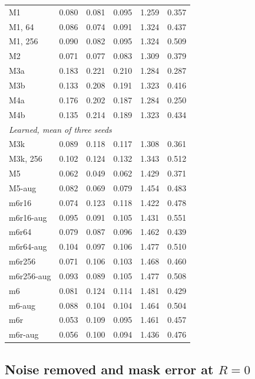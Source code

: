 \documentclass[preprint,12pt,authoryear]{elsarticle}
\begin{document}
\begin{table}[tbp]
\begin{tabular}{lccccc}
    M1 & 0.080 & 0.081 & 0.095 & 1.259 & 0.357 \\
    M1, 64 & 0.086 & 0.074 & 0.091 & 1.324 & 0.437 \\
    M1, 256 & 0.090 & 0.082 & 0.095 & 1.324 & 0.509 \\
    M2 & 0.071 & 0.077 & 0.083 & 1.309 & 0.379 \\
    M3a & 0.183 & 0.221 & 0.210 & 1.284 & 0.287 \\
    M3b & 0.133 & 0.208 & 0.191 & 1.323 & 0.416 \\
    M4a & 0.176 & 0.202 & 0.187 & 1.284 & 0.250 \\
    M4b & 0.135 & 0.214 & 0.189 & 1.323 & 0.434 \\
    \multicolumn{6}{l}{\textit{Learned, mean of three seeds}} \\
    M3k & 0.089 & 0.118 & 0.117 & 1.308 & 0.361 \\
    M3k, 256 & 0.102 & 0.124 & 0.132 & 1.343 & 0.512 \\
    M5 & 0.062 & 0.049 & 0.062 & 1.429 & 0.371 \\
    M5-aug & 0.082 & 0.069 & 0.079 & 1.454 & 0.483 \\
    m6r16 & 0.074 & 0.123 & 0.118 & 1.422 & 0.478 \\
    m6r16-aug & 0.095 & 0.091 & 0.105 & 1.431 & 0.551 \\
    m6r64 & 0.079 & 0.087 & 0.096 & 1.462 & 0.439 \\
    m6r64-aug & 0.104 & 0.097 & 0.106 & 1.477 & 0.510 \\
    m6r256 & 0.071 & 0.106 & 0.103 & 1.468 & 0.460 \\
    m6r256-aug & 0.093 & 0.089 & 0.105 & 1.477 & 0.508 \\
    m6 & 0.081 & 0.124 & 0.114 & 1.481 & 0.429 \\
    m6-aug & 0.088 & 0.104 & 0.104 & 1.464 & 0.504 \\
    m6r & 0.053 & 0.109 & 0.095 & 1.461 & 0.457 \\
    m6r-aug & 0.056 & 0.100 & 0.094 & 1.436 & 0.476 \\
    \bottomrule
  \end{tabular}
\end{table}

\subsection{Noise removed and mask error at $R = 0$}
\label{sec:res-noise}
\end{document}

